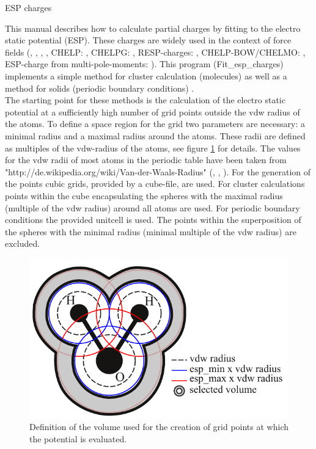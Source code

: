 \documentclass[12pt,a4paper,twoside,openany,titlepage,final]{book}
\begin{document}
\begin{center}
 \begin{Large}
 ESP charges
\end{Large}
\end{center}
This manual describes how to calculate partial charges by fitting to the electro static potential (ESP). These charges are 
widely used in the context of force fields (\cite{Momany1978}, \cite{Cox1981}, \cite{Singh1984}, \cite{Besler1990}, CHELP: 
\cite{Chirlian1987}, CHELPG: \cite{Breneman1990}, RESP-charges: \cite{Bayly1993}, CHELP-BOW/CHELMO: \cite{Sigfridsson1998}, 
ESP-charge from multi-pole-moments: \cite{Hu2007}). This program (Fit\_esp\_charges) implements a simple method for cluster calculation (molecules) as well as 
a method for solids (periodic boundary conditions) \cite{Chen2010}.\\
The starting point for these methods is the calculation of the electro static potential at a sufficiently high number of grid points 
outside the vdw radius of the atoms. To define a space region for the grid two parameters are necessary: a minimal radius and a
maximal radius around the atoms. These radii are defined as multiples of the vdw-radius of the atoms, see figure \ref{esp_radius} 
for details. The values for the vdw radii of most atoms in the periodic table have been taken from 
"http://de.wikipedia.org/wiki/Van-der-Waals-Radius" (\cite{Bondi1964}, \cite{Rowland1996}, \cite{Mantina2009}). For the generation 
of the points cubic grids, provided by a cube-file, are used. For cluster calculations points within the cube encapsulating the spheres with the maximal radius (multiple of the vdw radius) around all atoms are used. For periodic boundary conditions the provided unitcell is used. The points within the superposition of the spheres with the minimal radius (minimal multiple of the vdw radius) are excluded.\\
\begin{figure}[h]
\begin{center}
\includegraphics[height=9 cm]{esp_radius}
\end{center}
\caption{Definition of the volume used for the creation of grid points at which the potential is evaluated.} 
\label{esp_radius}
\end{figure}
\end{document}
